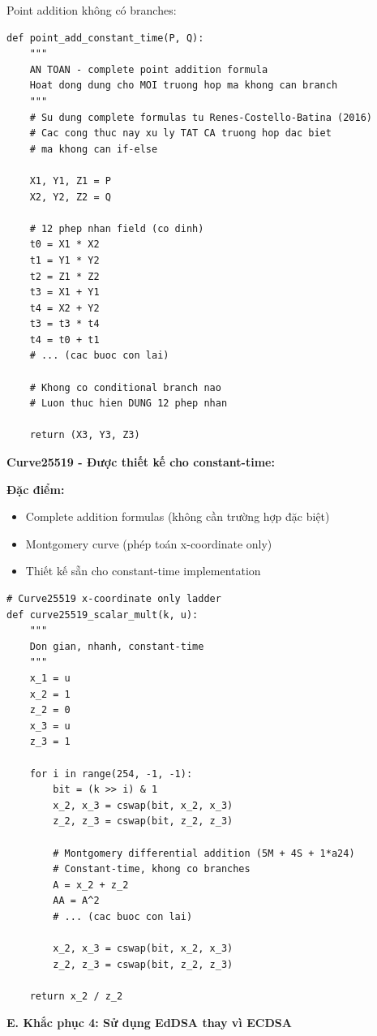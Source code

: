 Point addition không có branches:

\begin{verbatim}
def point_add_constant_time(P, Q):
    """
    AN TOAN - complete point addition formula
    Hoat dong dung cho MOI truong hop ma khong can branch
    """
    # Su dung complete formulas tu Renes-Costello-Batina (2016)
    # Cac cong thuc nay xu ly TAT CA truong hop dac biet
    # ma khong can if-else
    
    X1, Y1, Z1 = P
    X2, Y2, Z2 = Q
    
    # 12 phep nhan field (co dinh)
    t0 = X1 * X2
    t1 = Y1 * Y2
    t2 = Z1 * Z2
    t3 = X1 + Y1
    t4 = X2 + Y2
    t3 = t3 * t4
    t4 = t0 + t1
    # ... (cac buoc con lai)
    
    # Khong co conditional branch nao
    # Luon thuc hien DUNG 12 phep nhan
    
    return (X3, Y3, Z3)
\end{verbatim}

\textbf{Curve25519 - Được thiết kế cho constant-time:}

\textbf{Đặc điểm:}
\begin{itemize}
    \item Complete addition formulas (không cần trường hợp đặc biệt)
    \item Montgomery curve (phép toán x-coordinate only)
    \item Thiết kế sẵn cho constant-time implementation
\end{itemize}

\begin{verbatim}
# Curve25519 x-coordinate only ladder
def curve25519_scalar_mult(k, u):
    """
    Don gian, nhanh, constant-time
    """
    x_1 = u
    x_2 = 1
    z_2 = 0
    x_3 = u
    z_3 = 1
    
    for i in range(254, -1, -1):
        bit = (k >> i) & 1
        x_2, x_3 = cswap(bit, x_2, x_3)
        z_2, z_3 = cswap(bit, z_2, z_3)
        
        # Montgomery differential addition (5M + 4S + 1*a24)
        # Constant-time, khong co branches
        A = x_2 + z_2
        AA = A^2
        # ... (cac buoc con lai)
        
        x_2, x_3 = cswap(bit, x_2, x_3)
        z_2, z_3 = cswap(bit, z_2, z_3)
    
    return x_2 / z_2
\end{verbatim}

\textbf{E. Khắc phục 4: Sử dụng EdDSA thay vì ECDSA}

